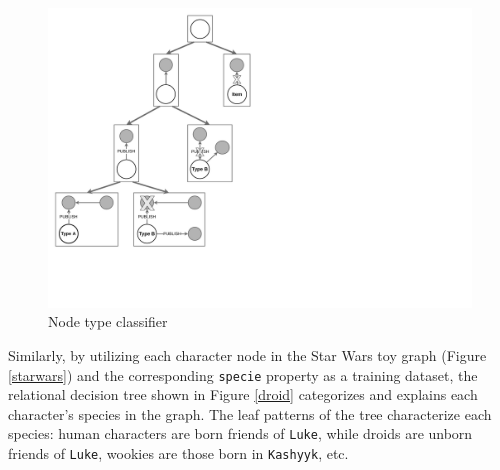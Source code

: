 \documentclass[mathematics,article,submit,pdftex,moreauthors]{Definitions/mdpi}
\begin{document}
\begin{figure}[h!]
	\centering
	\includegraphics[scale = 0.3]{png/FIG6.pdf}
	\caption{Node type classifier}
	\label{social1}
\end{figure}

Similarly, by utilizing each character node in the Star Wars toy graph (Figure \ref{starwars}) and the corresponding \texttt{specie} property as a training dataset, the relational decision tree shown in Figure \ref{droid} categorizes and explains each character's species in the graph. The leaf patterns of the tree characterize each species: human characters are born friends of \texttt{Luke}, while droids are unborn friends of \texttt{Luke}, wookies are those born in \texttt{Kashyyk}, etc.
\end{document}
